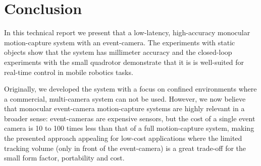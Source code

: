 \section{Conclusion}
\label{sec:conclusion}
In this technical report we present that a low-latency, high-accuracy monocular motion-capture system with an event-camera. The experiments with static objects show that the system has millimeter accuracy and the closed-loop experiments with the small quadrotor demonstrate that it is is well-suited for real-time control in mobile robotics tasks. 

Originally, we developed the system with a focus on confined environments where a commercial, multi-camera system can not be used. However, we now believe that monocular event-camera motion-capture systems are highly relevant in a broader sense: event-cameras are expensive sensors, but the cost of a single event camera is 10 to 100 times less than that of a full motion-capture system, making the presented approach appealing for low-cost applications where the limited tracking volume (only in front of the event-camera) is a great trade-off for the small form factor, portability and cost.